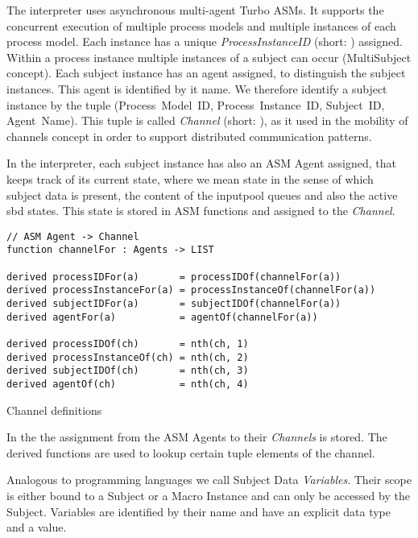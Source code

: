 The interpreter uses asynchronous multi-agent Turbo ASMs.
It supports the concurrent execution of multiple process models and multiple instances of each process model.
Each instance has a unique \textit{ProcessInstanceID} (short: ) assigned.
Within a process instance multiple instances of a subject can occur (MultiSubject concept).
Each subject instance has an agent assigned, to distinguish the subject instances.
This agent is identified by it name.
We therefore identify a subject instance by the tuple (Process~Model~ID, Process~Instance~ID, Subject~ID, Agent~Name).
This tuple is called \textit{Channel} (short: ), as it used in the mobility of channels concept in order to support distributed communication patterns.

In the interpreter, each subject instance has also an ASM Agent assigned, that keeps track of its current state,
where we mean state in the sense of which subject data is present, the content of the inputpool queues and also the active sbd states.
This state is stored in ASM functions and assigned to the \textit{Channel}.

\begin{listing}[H]
\begin{verbatim}
// ASM Agent -> Channel
function channelFor : Agents -> LIST

derived processIDFor(a)       = processIDOf(channelFor(a))
derived processInstanceFor(a) = processInstanceOf(channelFor(a))
derived subjectIDFor(a)       = subjectIDOf(channelFor(a))
derived agentFor(a)           = agentOf(channelFor(a))

derived processIDOf(ch)       = nth(ch, 1)
derived processInstanceOf(ch) = nth(ch, 2)
derived subjectIDOf(ch)       = nth(ch, 3)
derived agentOf(ch)           = nth(ch, 4)
\end{verbatim}
\caption{Channel definitions}
\label{lst:shortasm:channelFor}
\end{listing}

In the  the assignment from the ASM Agents to their \textit{Channels} is stored.
The derived functions are used to lookup certain tuple elements of the channel.





Analogous to programming languages we call Subject Data \textit{Variables}.
Their scope is either bound to a Subject or a Macro Instance and can only be
accessed by the Subject. Variables are identified by their name and have an
explicit data type and a value.

